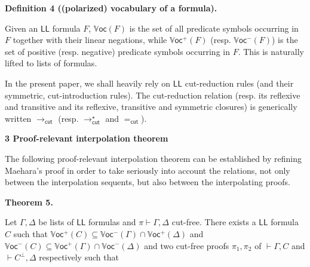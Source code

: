  
 
\par\medskip\noindent\textbf{Definition 4 ((polarized) vocabulary of a formula).}\par
 
 
Given an $\mathsf{LL}$ formula $F$, $\mathbb{V}\mathsf{oc}(F)$ is the set of all predicate symbols occurring in $F$ together with their linear negations, while $\mathbb{V}\mathsf{oc}^{+}(F)$ (resp. $\mathbb{V}\mathsf{oc}^{-}(F)$) is the set of positive (resp. negative) predicate symbols occurring in $F$. This is naturally lifted to lists of formulas.\par
 
 
 
 
In the present paper, we shall heavily rely on $\mathsf{LL}$ cut-reduction rules (and their symmetric, cut-introduction rules). The cut-reduction relation (resp. its reflexive and transitive and its reflexive, transitive and symmetric closures) is generically written $\longrightarrow_{\mathsf{cut}}$ (resp. $\longrightarrow^{\star}_{\mathsf{cut}}$ and $=_{\mathsf{cut}}$).\par
 
 


 
\par\medskip\noindent\textbf{3 Proof-relevant interpolation theorem}\par
 
 
The following proof-relevant interpolation theorem can be established by refining Maehara’s proof in order to take seriously into account the relations, not only between the interpolation sequents, but also between the interpolating proofs.\par
 
 
 
\par\medskip\noindent\textbf{Theorem 5.}\par
 
 
Let $\Gamma,\Delta$ be lists of $\mathsf{LL}$ formulas and $\pi\vdash\Gamma,\Delta$ cut-free. There exists a $\mathsf{LL}$ formula $C$ such that $\mathbb{V}\mathsf{oc}^{+}{(C)}\subseteq\mathbb{V}\mathsf{oc}^{-}{(\Gamma)}\cap\mathbb{V}\mathsf{oc}^{+}{(\Delta)}$ and $\mathbb{V}\mathsf{oc}^{-}{(C)}\subseteq\mathbb{V}\mathsf{oc}^{+}{(\Gamma)}\cap\mathbb{V}\mathsf{oc}^{-}{(\Delta)}$ and two cut-free proofs $\pi_{1},\pi_{2}$ of $\vdash\Gamma,C$ and $\vdash C^{\perp},\Delta$ respectively such that\par
 
